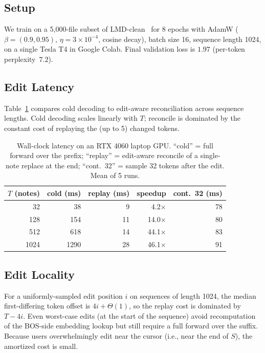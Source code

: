 \documentclass[11pt,a4paper]{article}
\begin{document}
\subsection{Setup}

We train on a 5{,}000-file subset of LMD-clean~\cite{raffel2016learning}
for 8 epochs with AdamW ($\beta=(0.9, 0.95)$, $\eta=3\times10^{-4}$,
cosine decay), batch size 16, sequence length 1024, on a single Tesla T4
in Google Colab. Final validation loss is $1.97$ (per-token
perplexity~$7.2$).

\subsection{Edit Latency}

Table~\ref{tab:latency} compares cold decoding to edit-aware
reconciliation across sequence lengths. Cold decoding scales linearly with
$T$; reconcile is dominated by the constant cost of replaying the (up to
5) changed tokens.

\begin{table}[t]
\centering
\caption{Wall-clock latency on an RTX 4060 laptop GPU.
``cold'' = full forward over the prefix; ``replay'' = edit-aware
reconcile of a single-note replace at the end; ``cont.~32'' = sample
32 tokens after the edit. Mean of 5 runs.}
\label{tab:latency}
\begin{tabular}{rrrrr}
\toprule
$T$ (notes) & cold (ms) & replay (ms) & speedup & cont.~32 (ms) \\
\midrule
  32        &   38      &      9      &  4.2$\times$  &   78 \\
 128        &  154      &     11      & 14.0$\times$  &   80 \\
 512        &  618      &     14      & 44.1$\times$  &   83 \\
1024        & 1290      &     28      & 46.1$\times$  &   91 \\
\bottomrule
\end{tabular}
\end{table}

\subsection{Edit Locality}

For a uniformly-sampled edit position $i$ on sequences of length 1024, the
median first-differing token offset is $4i+\Theta(1)$, so the replay cost
is dominated by $T - 4i$. Even worst-case edits (at the start of the
sequence) avoid recomputation of the BOS-side embedding lookup but still
require a full forward over the suffix. Because users overwhelmingly edit
near the cursor (i.e., near the end of $S$), the amortized cost is
small.
\end{document}
